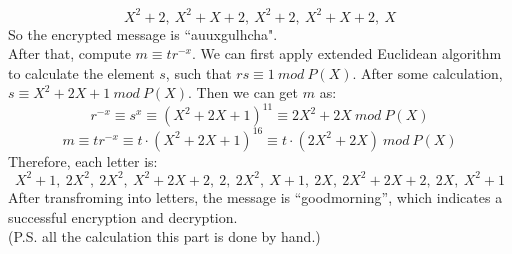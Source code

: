 \documentclass[12pt, a4paper]{article}
\begin{document}
\begin{enumerate}
          $$X^2+2,\ X^2+X+2,\ X^2+2,\ X^2+X+2,\ X$$
          So the encrypted message is ``auuxgulhcha".\\
          After that, compute $m\equiv tr^{-x}$. 
          We can first apply extended Euclidean algorithm to calculate the element $s$, 
          such that $rs \equiv 1\ mod\ P(X)$. After some calculation, $s\equiv X^2+2X+1\ mod\ P(X)$. Then we can get $m$ as:
          $$r^{-x} \equiv s^x \equiv (X^2+2X+1)^{11} \equiv 2X^2+2X\ mod\ P(X)$$
          $$m \equiv tr^{-x} \equiv t\cdot (X^2+2X+1)^16 \equiv t\cdot (2X^2+2X)\ mod\ P(X)$$
          Therefore, each letter is:
          $$X^2+1,\ 2X^2,\ 2X^2,\ X^2+2X+2,\ 2,\ 2X^2,\ X+1,\ 2X,\ 2X^2+2X+2,\ 2X,\ X^2+1$$
          After transfroming into letters, the message is ``goodmorning'', 
          which indicates a successful encryption and decryption.\\
          (P.S. all the calculation this part is done by hand.)

\end{enumerate}
\end{document}
